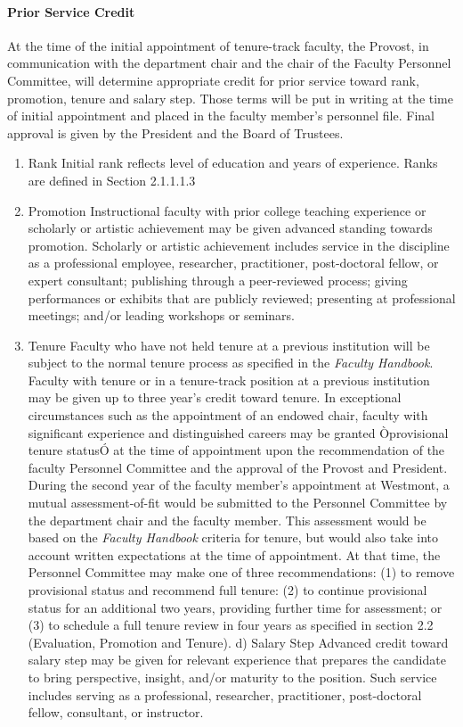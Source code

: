 \documentclass[letterpaper, 11pt]{article}
\begin{document}
			\paragraph{Prior Service Credit}
				At the time of the initial appointment of tenure-track faculty, the Provost, in communication with the department chair and the chair of the Faculty Personnel Committee, will determine appropriate credit for prior service toward rank, promotion, tenure and salary step.  Those terms will be put in writing at the time of initial appointment and placed in the faculty member's personnel file.  Final approval is given by the President and the Board of Trustees.
				\begin{enumerate}[label=\alph*)]
					\item{Rank Initial rank reflects level of education and years of experience.  Ranks are defined in Section 2.1.1.1.3}
					\item{Promotion Instructional faculty with prior college teaching experience or scholarly or artistic achievement may be given advanced standing towards promotion.  Scholarly or artistic achievement includes service in the discipline as a professional employee, researcher, practitioner, post-doctoral fellow, or expert consultant; publishing through a peer-reviewed process; giving performances or exhibits that are publicly reviewed; presenting at professional meetings; and/or leading workshops or seminars.}
					\item{Tenure Faculty who have not held tenure at a previous institution will be subject to the normal tenure process as specified in the \emph{Faculty Handbook}.  Faculty with tenure or in a tenure-track position at a previous institution may be given up to three year's credit toward tenure.}
					In exceptional circumstances such as the appointment of an endowed chair, faculty with significant experience and distinguished careers may be granted Òprovisional tenure statusÓ at the time of appointment upon the recommendation of the faculty Personnel Committee and the approval of the Provost and President.  During the second year of the faculty member's appointment at Westmont, a mutual assessment-of-fit would be submitted to the Personnel Committee by the department chair and the faculty member.  This assessment would be based on the \emph{Faculty Handbook} criteria for tenure, but would also take into account written expectations at the time of appointment.  At that time, the Personnel Committee may make one of three recommendations: (1) to remove provisional status and recommend full tenure: (2) to continue provisional status for an additional two years, providing further time for assessment; or (3) to schedule a full tenure review in four years as specified in section 2.2 (Evaluation, Promotion and Tenure).
					d)	Salary Step Advanced credit toward salary step may be given for relevant experience that prepares the candidate to bring perspective, insight, and/or maturity to the position.  Such service includes serving as a professional, researcher, practitioner, post-doctoral fellow, consultant, or instructor.

				\end{enumerate}
\end{document}
